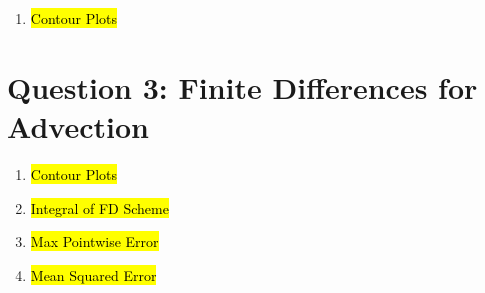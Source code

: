 \documentclass{article}
\begin{document}
\begin{enumerate}[label=\alph*)]
\begin{proof}
\begin{align*}
            &= \frac{1}{4\pi^2}\int_0^{2\pi}\int_0^{2\pi}1 - \cos(2x+2y)dxdy\\
            &= \frac{1}{4\pi^2}\left(4\pi^2 -
            \int_0^{2\pi}\int_0^{2\pi}\cos(2x+2y)dxdy\right)\\
            &= 1 - \frac{1}{4\pi^2}\int_0^{2\pi}\int_0^{2\pi}\cos(2x+2y)dxdy\\
            &= 1 - \frac{1}{4\pi^2}\int_0^{2\pi}0dxdy\\
            &= 1
        \end{align*}
        Thus we have that U will satisfy this integral at every timestep.
    \end{proof}
    
    \item \hl{Contour Plots}

\end{enumerate}

\section*{Question 3: Finite Differences for Advection}

\begin{enumerate}[label=\alph*)]

    \item \hl{Contour Plots}
    \item \hl{Integral of FD Scheme}
    \item \hl{Max Pointwise Error}
    \item \hl{Mean Squared Error}


\end{enumerate}
\end{document}
